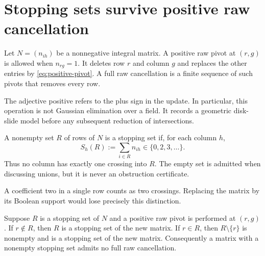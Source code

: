 \section{Stopping sets survive positive raw cancellation}
\label{sec:stopping}

\begin{definition}
Let $N=(n_{ih})$ be a nonnegative integral matrix. A positive raw pivot at
$(r,g)$ is allowed when $n_{rg}=1$. It deletes row $r$ and column $g$ and
replaces the other entries by \eqref{eq:positive-pivot}. A full raw
cancellation is a finite sequence of such pivots that removes every row.
\end{definition}

The adjective positive refers to the plus sign in the update. In particular,
this operation is not Gaussian elimination over a field. It records a
geometric disk-slide model before any subsequent reduction of intersections.

\begin{definition}
A nonempty set $R$ of rows of $N$ is a stopping set if, for each column $h$,
\begin{equation}\label{eq:stopping}
 S_h(R):=\sum_{i\in R}n_{ih}\in\{0,2,3,\ldots\}.
\end{equation}
Thus no column has exactly one crossing into $R$. The empty set is admitted
when discussing unions, but it is never an obstruction certificate.
\end{definition}

A coefficient two in a single row counts as two crossings. Replacing the
matrix by its Boolean support would lose precisely this distinction.

\begin{theorem}
\label{thm:persistence}
Suppose $R$ is a stopping set of $N$ and a positive raw pivot is performed
at $(r,g)$. If $r\notin R$, then $R$ is a stopping set of the new matrix.
If $r\in R$, then $R\setminus\{r\}$ is nonempty and is a stopping set of
the new matrix. Consequently a matrix with a nonempty stopping set admits
no full raw cancellation.
\end{theorem}

